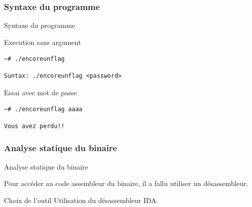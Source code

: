 \documentclass[10pt,sans,usenames,dvipsnames,french,compress]{beamer}
\begin{document}
\subsubsection{Syntaxe du programme}
\begin{frame}[fragile]{Syntaxe du programme}
	\begin{block}{Execution sans argument}
		\vspace{-3mm}
		\begin{lstlisting}[style=Term]
			~# ./encoreunflag
		\end{lstlisting}
		\vspace{-2mm}
	\end{block}

	\begin{block}{}
		\vspace{-3mm}
		\begin{lstlisting}[style=Term]
			Suntax: ./encoreunflag <password>
		\end{lstlisting}
		\vspace{-2mm}
	\end{block}

	\begin{block}{Essai avec mot de passe}
		\vspace{-3mm}
		\begin{lstlisting}[style=Term]
			~# ./encoreunflag aaaa
		\end{lstlisting}
		\vspace{-2mm}
	\end{block}

	\begin{block}{}
		\vspace{-3mm}
		\begin{lstlisting}[style=Term]
			Vous avez perdu!!
		\end{lstlisting}
		\vspace{-2mm}
	\end{block}
\end{frame}

\subsubsection{Analyse statique du binaire}
\begin{frame}[fragile]{Analyse statique du binaire}
	\begin{block}{}
		Pour accéder au code assembleur du binaire, il a fallu utiliser un désassembleur.
	\end{block}

	\begin{exampleblock}{Choix de l'outil}
		Utilisation du désassembleur IDA.
	\end{exampleblock}
\end{frame}
\end{document}
